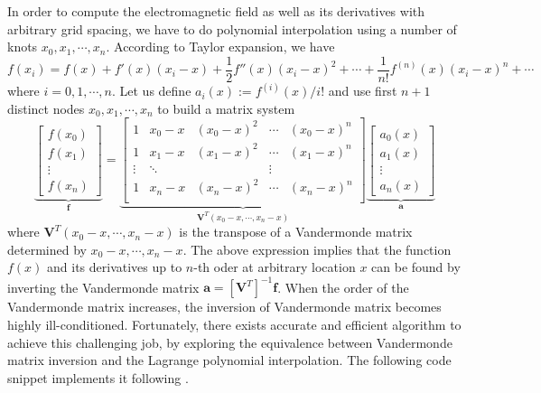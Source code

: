 \documentclass[a4paper,10pt]{article}
\begin{document}
In order to compute the electromagnetic field as well as its derivatives with arbitrary grid spacing, we have to do polynomial interpolation using a number of knots $x_0, x_1,\cdots, x_n$. According to Taylor expansion, we have
\begin{equation}
  f(x_i) = f(x) + f'(x)(x_i-x) + \frac{1}{2}f''(x)(x_i-x)^2 + \cdots +
  \frac{1}{n!}f^{(n)}(x)(x_i-x)^n+\cdots 
\end{equation}
where $i=0,1,\cdots,n$. Let us define $a_i(x):=f^{(i)}(x)/i!$ and use first $n+1$ distinct nodes $x_0,x_1,\cdots, x_n$ to build a matrix system
\begin{equation}
  \underbrace{  \begin{bmatrix}
      f(x_0)\\
      f(x_1)\\
      \vdots\\
      f(x_n)
  \end{bmatrix}}_{\mathbf{f}}
  =\underbrace{\begin{bmatrix}
      1 & x_0-x & (x_0-x)^2 & \cdots & (x_0-x)^n\\
      1 & x_1-x & (x_1-x)^2 & \cdots & (x_1-x)^n\\
      \vdots & \ddots & & \vdots\\
      1 & x_n-x & (x_n-x)^2 & \cdots & (x_n-x)^n\\
  \end{bmatrix}}_{\mathbf{V}^T(x_0-x,\cdots,x_n-x)} \underbrace{\begin{bmatrix}
      a_0(x)\\
      a_1(x)\\
      \vdots\\
      a_n(x)
  \end{bmatrix}}_{\mathbf{a}}
\end{equation}
where $\mathbf{V}^T(x_0-x,\cdots,x_n-x)$ is the transpose of a Vandermonde matrix determined by $x_0-x,\cdots,x_n-x$. The above expression implies that the function $f(x)$ and its derivatives up to $n$-th oder at arbitrary location $x$ can be found by inverting the Vandermonde matrix $\mathbf{a}=[\mathbf{V}^T]^{-1}\mathbf{f}$. When the order of the Vandermonde matrix increases, the inversion of Vandermonde matrix becomes highly ill-conditioned. Fortunately, there exists accurate and efficient algorithm \citep{bjorck1970solution} to achieve this challenging job, by exploring the equivalence between Vandermonde matrix inversion and the Lagrange polynomial interpolation. The following code snippet implements it following \citep[Algorithm 4.6.1]{Golub_1996_MATCOMP}.
\end{document}
